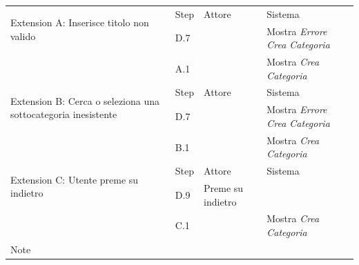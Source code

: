  \begin{table}[H]
\def\arraystretch{1.5}
\begin{tabularx}{\linewidth}{|l|X|X|X|}
 
 \hline \multirow{2}{6cm}{Extension A: Inserisce titolo non valido} & Step &
  Attore & Sistema \\
 \cline{2-4} & D.7 & & Mostra \textit{Errore Crea Categoria} \\
  \cline{2-4} & A.1 & & Mostra \textit{Crea Categoria}\\
 \hline
  \multirow{2}{6cm}{Extension B: Cerca o seleziona una sottocategoria inesistente} & Step & Attore & Sistema \\
 \cline{2-4} & D.7 & & Mostra \textit{Errore Crea Categoria} \\
  \cline{2-4} & B.1 & & Mostra \textit{Crea Categoria}\\
 \hline 
   \multirow{2}{6cm}{Extension C: Utente preme su indietro} & Step & Attore & Sistema \\
 \cline{2-4} & D.9 & Preme su indietro &  \\
  \cline{2-4} & C.1 & & Mostra \textit{Crea Categoria}\\
 \hline Note & \multicolumn{3}{l|}{} \\
 \hline


\end{tabularx}
\end{table}
\newpage

